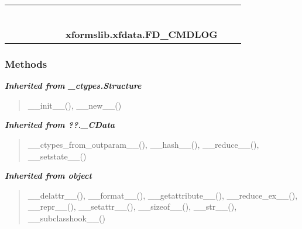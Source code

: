     \label{xformslib:xfdata:FD_CMDLOG}
\begin{tabular}{cccccccccc}
\multicolumn{2}{r}{\settowidth{\BCL}{object}\multirow{2}{\BCL}{object}}
&&
&&
&&
  \\\cline{3-3}
  &&\multicolumn{1}{c|}{}
&&
&&
&&
  \\
\multicolumn{4}{r}{\settowidth{\BCL}{??.\_CData}\multirow{2}{\BCL}{??.\_CData}}
&&
&&
  \\\cline{5-5}
  &&&&\multicolumn{1}{c|}{}
&&
&&
  \\
\multicolumn{6}{r}{\settowidth{\BCL}{\_ctypes.Structure}\multirow{2}{\BCL}{\_ctypes.Structure}}
&&
  \\\cline{7-7}
  &&&&&&\multicolumn{1}{c|}{}
&&
  \\
&&&&&&\multicolumn{2}{l}{\textbf{xformslib.xfdata.FD\_CMDLOG}}
\end{tabular}



  \subsubsection{Methods}


\large{\textbf{\textit{Inherited from \_ctypes.Structure}}}

\begin{quote}
\_\_init\_\_(), \_\_new\_\_()
\end{quote}

\large{\textbf{\textit{Inherited from ??.\_CData}}}

\begin{quote}
\_\_ctypes\_from\_outparam\_\_(), \_\_hash\_\_(), \_\_reduce\_\_(), \_\_setstate\_\_()
\end{quote}

\large{\textbf{\textit{Inherited from object}}}

\begin{quote}
\_\_delattr\_\_(), \_\_format\_\_(), \_\_getattribute\_\_(), \_\_reduce\_ex\_\_(), \_\_repr\_\_(), \_\_setattr\_\_(), \_\_sizeof\_\_(), \_\_str\_\_(), \_\_subclasshook\_\_()
\end{quote}


